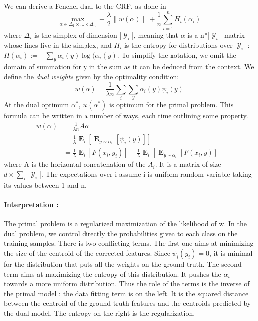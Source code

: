 \documentclass{article}
\DeclareMathOperator{\E}{\mathbf{E}}
\DeclareMathOperator{\Y}{\mathcal{Y}}
\begin{document}
We can derive a Fenchel dual to the CRF, as done in 
\begin{equation}
	\max_{\alpha\in\Delta_{1} \times \dots \times \Delta_{n}} -\frac{\lambda}{2}\|w(\alpha)\| +\frac{1}{n} \sum_{i=1}^n H_i(\alpha_i)
\end{equation}
where $\Delta_i$ is the simplex of dimension $|\Y_i|$, meaning that $\alpha$ is a n*$|\Y_i|$ matrix whose lines live in the simplex, and $H_i$ is the entropy for distributions over $\Y_i$ : $H(\alpha_i) := - \sum_y \alpha_i(y) \log(\alpha_i(y)$. To simplify the notation, we omit the domain of summation for y in the sum as it can be deduced from the context. We define the \textit{dual weights} given by the optimality condition:
\begin{equation*}
	w(\alpha) = \frac{1}{\lambda n} \sum_i \sum_y \alpha_i(y) \psi_i(y) 
\end{equation*}
At the dual optimum $\alpha^*$, $w(\alpha^*)$ is optimum for the primal problem. This formula can be written in a number of ways, each time outlining some property.
\begin{align}
	w(\alpha) & = \frac{1}{\lambda n} A \alpha \label{linear combination of probabilities} \\
	 & = \frac{1}{\lambda} \E_{i} [ \E_{y \sim \alpha_i} [\psi_i(y)]] \label{mean of the corrected features} \\
	 & =   \frac{1}{\lambda} \E_{i} [F(x_i, y_i)] - \frac{1}{\lambda} \E_{i} [ \E_{y \sim \alpha_i} [F(x_i, y)]]
	 \label{difference between ground truth and dual weights}
\end{align}
where A is the horizontal concatenation of the $A_i$. It is a matrix of size $d \times \sum_i |\Y_i|$. The expectations over i assume i is uniform random variable taking its values between 1 and n. 

\paragraph{Interpretation :} The primal problem is a regularized maximization of the likelihood of w.  In the dual problem, we control directly the probabilities given to each class on the training samples. There is two conflicting terms. The first one aims at minimizing the size of the centroid of the corrected features. Since $\psi_i(y_i)=0$, it is minimal for the distribution that puts all the weights on the ground truth. The second term aims at maximizing the entropy of this distribution. It pushes the $\alpha_i$ towards a more uniform distribution. Thus the role of the terms is the inverse of the primal model : the data fitting term is on the left. It is the squared distance between the centroid of the ground truth features and the centroids predicted by the dual model. The entropy on the right is the regularization. 
\end{document}

